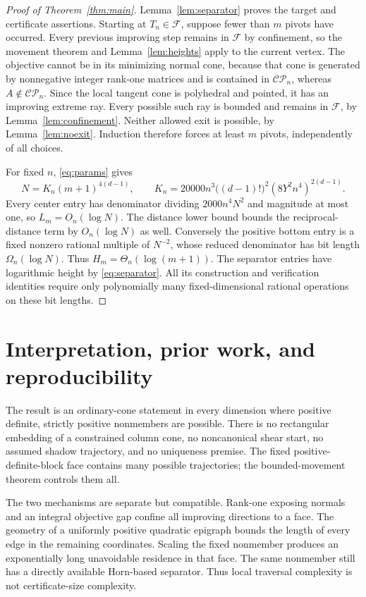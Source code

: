 \documentclass[11pt]{article}
\theoremstyle{remark}\newtheorem{remark}[theorem]{Remark}
\newcommand{\CP}{\mathcal{CP}}\newcommand{\COP}{\mathcal{COP}}
\begin{document}
\begin{proof}[Proof of Theorem~\ref{thm:main}]
Lemma~\ref{lem:separator} proves the target and certificate assertions. Starting at $T_n\in\mathcal F$, suppose fewer than $m$ pivots have occurred. Every previous improving step remains in $\mathcal F$ by confinement, so the movement theorem and Lemma~\ref{lem:heights} apply to the current vertex. The objective cannot be in its minimizing normal cone, because that cone is generated by nonnegative integer rank-one matrices and is contained in $\CP_n$, whereas $A\notin\CP_n$. Since the local tangent cone is polyhedral and pointed, it has an improving extreme ray. Every possible such ray is bounded and remains in $\mathcal F$, by Lemma~\ref{lem:confinement}. Neither allowed exit is possible, by Lemma~\ref{lem:noexit}. Induction therefore forces at least $m$ pivots, independently of all choices.

For fixed $n$, \eqref{eq:params} gives
\[
 N=K_n(m+1)^{4(d-1)},\qquad
 K_n=20000n^3\bigl((d-1)!\bigr)^2(8Y^2n^4)^{2(d-1)}.
\]
Every center entry has denominator dividing $2000n^4N^2$ and magnitude at most one, so $L_m=O_n(\log N)$. The distance lower bound bounds the reciprocal-distance term by $O_n(\log N)$ as well. Conversely the positive bottom entry is a fixed nonzero rational multiple of $N^{-2}$, whose reduced denominator has bit length $\Omega_n(\log N)$. Thus $H_m=\Theta_n(\log(m+1))$. The separator entries have logarithmic height by \eqref{eq:separator}. All its construction and verification identities require only polynomially many fixed-dimensional rational operations on these bit lengths.
\end{proof}

\section{Interpretation, prior work, and reproducibility}
The result is an ordinary-cone statement in every dimension where positive definite, strictly positive nonmembers are possible. There is no rectangular embedding of a constrained column cone, no noncanonical shear start, no assumed shadow trajectory, and no uniqueness premise. The fixed positive-definite-block face contains many possible trajectories; the bounded-movement theorem controls them all.

The two mechanisms are separate but compatible. Rank-one exposing normals and an integral objective gap confine all improving directions to a face. The geometry of a uniformly positive quadratic epigraph bounds the length of every edge in the remaining coordinates. Scaling the fixed nonmember produces an exponentially long unavoidable residence in that face. The same nonmember still has a directly available Horn-based separator. Thus local traversal complexity is not certificate-size complexity.
\end{document}
